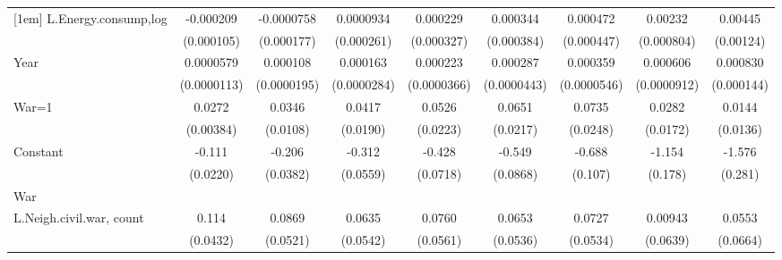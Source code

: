 \begin{table}[htbp]
\begin{tabular}{l*{8}{c}}
[1em]
L.Energy.consump,log&   -0.000209\sym{**} &  -0.0000758         &   0.0000934         &    0.000229         &    0.000344         &    0.000472         &     0.00232\sym{***}&     0.00445\sym{***}\\
                    &  (0.000105)         &  (0.000177)         &  (0.000261)         &  (0.000327)         &  (0.000384)         &  (0.000447)         &  (0.000804)         &   (0.00124)         \\
[1em]
Year                &   0.0000579\sym{***}&    0.000108\sym{***}&    0.000163\sym{***}&    0.000223\sym{***}&    0.000287\sym{***}&    0.000359\sym{***}&    0.000606\sym{***}&    0.000830\sym{***}\\
                    & (0.0000113)         & (0.0000195)         & (0.0000284)         & (0.0000366)         & (0.0000443)         & (0.0000546)         & (0.0000912)         &  (0.000144)         \\
[1em]
War=1               &      0.0272\sym{***}&      0.0346\sym{***}&      0.0417\sym{**} &      0.0526\sym{**} &      0.0651\sym{***}&      0.0735\sym{***}&      0.0282         &      0.0144         \\
                    &   (0.00384)         &    (0.0108)         &    (0.0190)         &    (0.0223)         &    (0.0217)         &    (0.0248)         &    (0.0172)         &    (0.0136)         \\
[1em]
Constant            &      -0.111\sym{***}&      -0.206\sym{***}&      -0.312\sym{***}&      -0.428\sym{***}&      -0.549\sym{***}&      -0.688\sym{***}&      -1.154\sym{***}&      -1.576\sym{***}\\
                    &    (0.0220)         &    (0.0382)         &    (0.0559)         &    (0.0718)         &    (0.0868)         &     (0.107)         &     (0.178)         &     (0.281)         \\
\hline
War                 &                     &                     &                     &                     &                     &                     &                     &                     \\
L.Neigh.civil.war, count&       0.114\sym{***}&      0.0869\sym{*}  &      0.0635         &      0.0760         &      0.0653         &      0.0727         &     0.00943         &      0.0553         \\
                    &    (0.0432)         &    (0.0521)         &    (0.0542)         &    (0.0561)         &    (0.0536)         &    (0.0534)         &    (0.0639)         &    (0.0664)         \\

\end{tabular}
\end{table}
